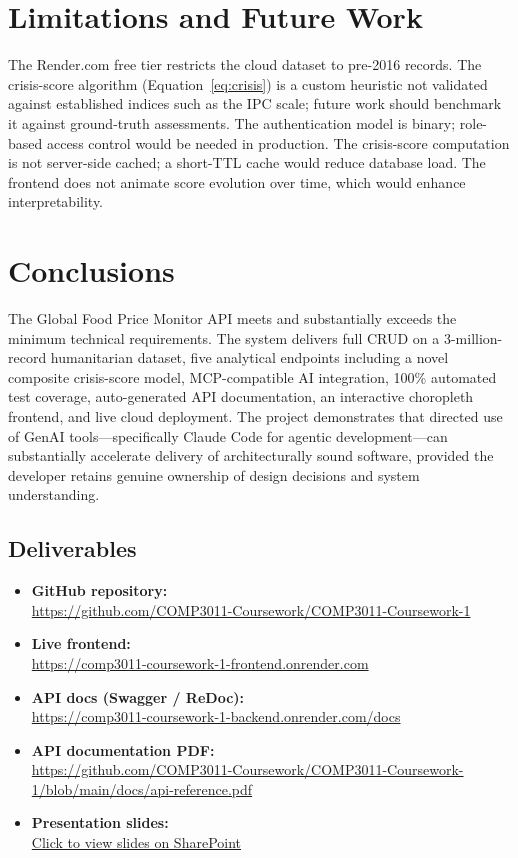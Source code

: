 \section{Limitations and Future Work}

The Render.com free tier restricts the cloud dataset to pre-2016 records.
The crisis-score algorithm (Equation~\eqref{eq:crisis}) is a custom heuristic not
validated against established indices such as the IPC scale; future work should
benchmark it against ground-truth assessments.
The authentication model is binary; role-based access control would be needed in
production.
The crisis-score computation is not server-side cached; a short-TTL cache would
reduce database load.
The frontend does not animate score evolution over time, which would enhance
interpretability.

\section{Conclusions}

The Global Food Price Monitor API meets and substantially exceeds the minimum
technical requirements.
The system delivers full CRUD on a 3-million-record humanitarian dataset, five
analytical endpoints including a novel composite crisis-score model, MCP-compatible
AI integration, 100\% automated test coverage, auto-generated API documentation,
an interactive choropleth frontend, and live cloud deployment.
The project demonstrates that directed use of GenAI tools---specifically Claude
Code for agentic development---can substantially accelerate delivery of
architecturally sound software, provided the developer retains genuine ownership
of design decisions and system understanding.

\subsection*{Deliverables}
\begin{itemize}
  \item \textbf{GitHub repository:}\\\url{https://github.com/COMP3011-Coursework/COMP3011-Coursework-1}
  \item \textbf{Live frontend:}\\\url{https://comp3011-coursework-1-frontend.onrender.com}
  \item \textbf{API docs (Swagger / ReDoc):}\\\url{https://comp3011-coursework-1-backend.onrender.com/docs}
  \item \textbf{API documentation PDF:}\\\url{https://github.com/COMP3011-Coursework/COMP3011-Coursework-1/blob/main/docs/api-reference.pdf}
  \item \textbf{Presentation slides:}\\\href{https://leeds365-my.sharepoint.com/:p:/g/personal/fy22az_leeds_ac_uk/IQAzCfArJhdOSoHPXOb2jwl4Acw6uB58h-HJmVDQevXYUGE?e=V1H29b}{Click to view slides on SharePoint}
\end{itemize}
